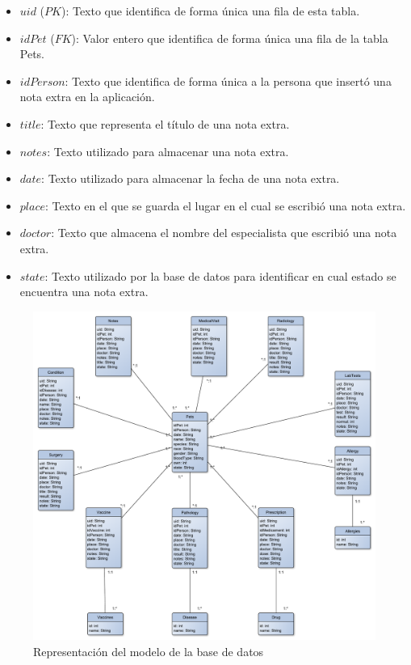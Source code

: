 \begin{itemize}
\item	$uid$ ($PK$): Texto que identifica de forma única una fila de esta tabla.
\item	$idPet$ ($FK$): Valor entero que identifica de forma única una fila de la tabla Pets.
\item	$idPerson$: Texto que identifica de forma única a la persona que insertó una nota extra en la aplicación.
\item	$title$: Texto que representa el título de una nota extra.
\item	$notes$: Texto utilizado para almacenar una nota extra.
\item	$date$: Texto utilizado para almacenar la fecha de una nota extra.
\item	$place$: Texto en el que se guarda el lugar en el cual se escribió una nota extra.
\item	$doctor$: Texto que almacena el nombre del especialista que escribió una nota extra.
\item	$state$: Texto utilizado por la base de datos para identificar en cual estado se encuentra una nota extra.
\end{itemize}



\begin{figure}[h!]
\begin{center}
\includegraphics[scale=0.3]{Graphics/images/model1.pdf}
\caption{Representación del modelo de la base de datos}
\label{fig:rcm}

\end{center}
\end{figure}




